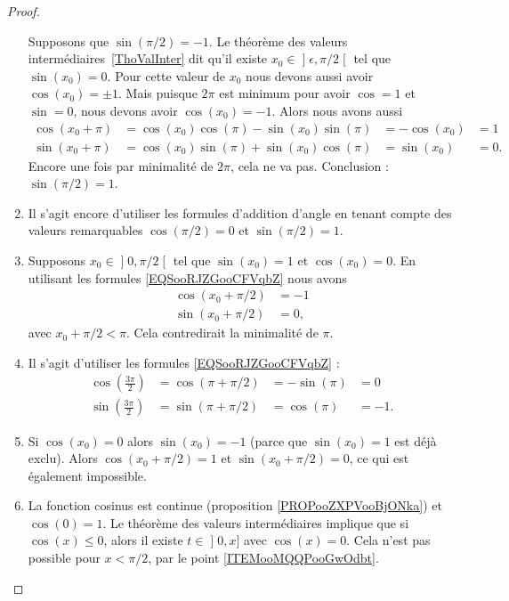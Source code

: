 \begin{proof}
\begin{enumerate}
			      Supposons que \( \sin(\pi/2)=-1\). Le théorème des valeurs intermédiaires~\ref{ThoValInter} dit qu'il existe \( x_0\in\mathopen] \epsilon , \pi/2 \mathclose[\) tel que \( \sin(x_0)=0\). Pour cette valeur de \( x_0\) nous devons aussi avoir \( \cos(x_0)=\pm 1\). Mais puisque \( 2\pi\) est minimum pour avoir \( \cos=1\) et \( \sin=0\), nous devons avoir \( \cos(x_0)=-1\). Alors nous avons aussi
		      \begin{subequations}
			      \begin{align}
				      \cos(x_0+\pi) & =\cos(x_0)\cos(\pi)-\sin(x_0)\sin(\pi) & =-\cos(x_0)  & =1    \\
				      \sin(x_0+\pi) & =\cos(x_0)\sin(\pi)+\sin(x_0)\cos(\pi) & = \sin(x_0)  & =0.
			      \end{align}
		      \end{subequations}
		      Encore une fois par minimalité de \( 2\pi\), cela ne va pas. Conclusion : \( \sin(\pi/2)=1\).
		\item
		      Il s'agit encore d'utiliser les formules d'addition d'angle en tenant compte des valeurs remarquables \( \cos(\pi/2)=0\) et \( \sin(\pi/2)=1\).
		\item
		      Supposons \( x_0\in\mathopen] 0 , \pi/2 \mathclose[\) tel que \( \sin(x_0)=1\) et \( \cos(x_0)=0\). En utilisant les formules \eqref{EQSooRJZGooCFVqbZ} nous avons
		      \begin{subequations}
			      \begin{align}
				      \cos(x_0+\pi/2) & =-1 \\
				      \sin(x_0+\pi/2) & =0,
			      \end{align}
		      \end{subequations}
		      avec \( x_0+\pi/2<\pi\). Cela contredirait la minimalité de \( \pi\).
		\item
		      Il s'agit d'utiliser les formules \eqref{EQSooRJZGooCFVqbZ} :
		      \begin{subequations}
			      \begin{align}
				      \cos(\frac{ 3\pi }{ 2 })  & =\cos(\pi+\pi/2)  & =-\sin(\pi) &=0     \\
				      \sin(\frac{ 3\pi }{ 2 })  & =\sin(\pi+\pi/2)  & = \cos(\pi) &=-1.
			      \end{align}
		      \end{subequations}
		\item
		      Si \( \cos(x_0)=0\) alors \( \sin(x_0)=-1\) (parce que \( \sin(x_0)=1\) est déjà exclu). Alors \( \cos(x_0+\pi/2)=1\) et \( \sin(x_0+\pi/2)=0\), ce qui est également impossible.
		\item
		      La fonction cosinus est continue (proposition \ref{PROPooZXPVooBjONka}) et \( \cos(0)=1\). Le théorème des valeurs intermédiaires implique que si \( \cos(x)\leq 0\), alors il existe \( t\in \mathopen] 0 , x \mathclose]\) avec \( \cos(x)=0\). Cela n'est pas possible pour \( x<\pi/2\), par le point \ref{ITEMooMQQPooGwOdbt}.


\end{enumerate}
\end{proof}
